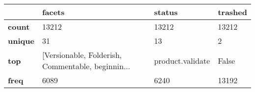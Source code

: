 \begin{tabularx}{\linewidth}{lXXX}
\toprule
{} &                                             facets &            status & trashed \\
\midrule
\textbf{count } &                                              13212 &             13212 &   13212 \\
\textbf{unique} &                                                 31 &                13 &       2 \\
\textbf{top   } &  [Versionable, Folderish, Commentable, beginnin... &  product.validate &   False \\
\textbf{freq  } &                                               6089 &              6240 &   13192 \\
\bottomrule
\end{tabularx}
